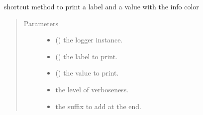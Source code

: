 \documentclass[a4paper,10pt,english]{sphinxmanual}
\begin{document}

\begin{fulllineitems}
\label{\detokenize{commands/apidoc/src:src.printcolors.print_value}}
shortcut method to print a label and a value with the info color
\begin{quote}\begin{description}
\item[{Parameters}] \leavevmode\begin{itemize}
\item {} 
 () \textendash{} the logger instance.

\item {} 
 () \textendash{} the label to print.

\item {} 
 () \textendash{} the value to print.

\item {} 
 \textendash{} the level of verboseness.

\item {} 
 \textendash{} the suffix to add at the end.

\end{itemize}

\end{description}\end{quote}

\end{fulllineitems}

\end{document}
